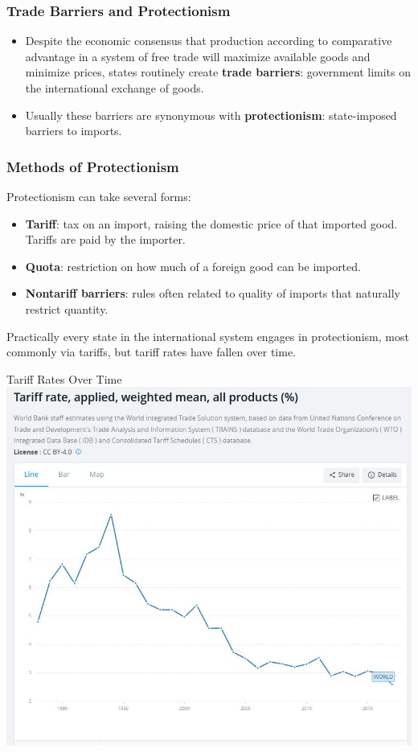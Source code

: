\documentclass{beamer}
\begin{document}
\begin{frame} 
	\frametitle{\LARGE{Trade Barriers and Protectionism}}
	\begin{itemize}
		\item Despite the economic consensus that production according to comparative advantage in a system of free trade will maximize available goods and minimize prices, states routinely create \textbf{trade barriers}: government limits on the international exchange of goods. \pause
		\item Usually these barriers are synonymous with \textbf{protectionism}: state-imposed barriers to imports.
	\end{itemize}
\end{frame}

\begin{frame} 
	\frametitle{\LARGE{Methods of Protectionism}}
Protectionism can take several forms:
	\begin{itemize}
		\item \textbf{Tariff}: tax on an import, raising the domestic price of that imported good. Tariffs are paid by the importer. \pause
		\item \textbf{Quota}: restriction on how much of a foreign good can be imported. \pause
		\item \textbf{Nontariff barriers}: rules often related to quality of imports that naturally restrict quantity. 
	\end{itemize}
Practically every state in the international system engages in protectionism, most commonly via tariffs, but tariff rates have fallen over time. 
\end{frame}

\begin{frame}{\LARGE Tariff Rates Over Time}
	\centering
	\includegraphics[width=\textwidth,height=0.8\textheight,keepaspectratio]{tariff rate over time.JPG}
\end{frame}
\end{document}
